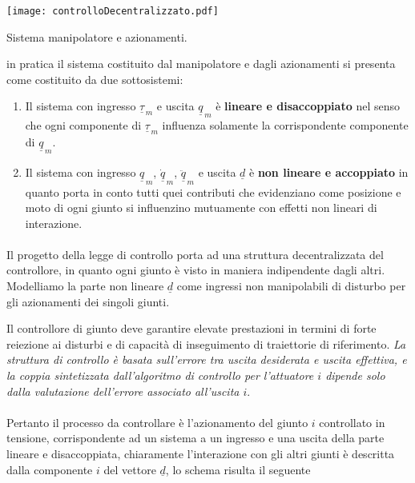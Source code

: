 \begin{center}
	\texttt{[image: controlloDecentralizzato.pdf]}
	\caption{Sistema manipolatore e azionamenti.}
\end{center}
in pratica il sistema costituito dal manipolatore e dagli azionamenti si presenta come costituito da due sottosistemi:
\begin{enumerate}
	\item Il sistema con ingresso $\underline{\tau}_{\,m}$ e uscita $\underline{q}_{\,m}$ è \textbf{lineare e disaccoppiato} nel senso che ogni componente di $\underline{\tau}_{\,m}$ influenza solamente la corrispondente componente di $\underline{q}_{\,m}$.
	\item Il sistema con ingresso $\underline{q}_{\,m}$, $\underline{\dot{q}}_{\,m}$, $\underline{\ddot{q}}_{\,m}$ e uscita $\underline{d}$ è \textbf{non lineare e accoppiato} in quanto porta in conto tutti quei contributi che evidenziano come posizione e moto di ogni giunto si influenzino mutuamente con effetti non lineari di interazione.
\end{enumerate}

\paragraph{}
Il progetto della legge di controllo porta ad una struttura decentralizzata del controllore, in quanto ogni giunto è visto in maniera indipendente dagli altri. Modelliamo la parte non lineare $\underline{d}$ come ingressi non manipolabili di disturbo per gli azionamenti dei singoli giunti. 

Il controllore di giunto deve garantire elevate prestazioni in termini di forte reiezione ai disturbi e di capacità di inseguimento di traiettorie di riferimento. \emph{La struttura di controllo è basata sull'errore tra uscita desiderata e uscita effettiva, e la coppia sintetizzata dall'algoritmo di controllo per l'attuatore $i$ dipende solo dalla valutazione dell'errore associato all'uscita $i$}.

\paragraph{}
Pertanto il processo da controllare è l'azionamento del giunto $i$ controllato in tensione, corrispondente ad un sistema a un ingresso e una uscita della parte lineare e disaccoppiata, chiaramente l'interazione con gli altri giunti è descritta dalla componente $i$ del vettore $\underline{d}$, lo schema risulta il seguente

